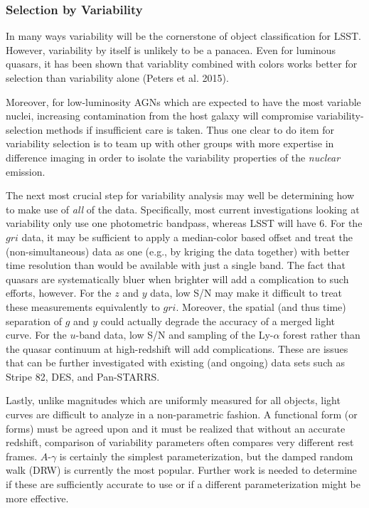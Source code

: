 \subsubsection{Selection by Variability}

In many ways variability will be the cornerstone of object
classification for LSST.  However, variability by itself is unlikely
to be a panacea.  Even for luminous quasars, it has been shown that
variablity combined with colors works better for selection than
variability alone (Peters et al. 2015).  

Moreover, for low-luminosity AGNs which are expected to have the most
variable nuclei, increasing contamination from the host galaxy will
compromise variability-selection methods if insufficient care is
taken.  Thus one clear to do item for variability selection is to team
up with other groups with more expertise in difference imaging in
order to isolate the variability properties of the {\em nuclear}
emission.

The next most crucial step for variability analysis may well be
determining how to make use of {\em all} of the data.  Specifically,
most current investigations looking at variability only use one
photometric bandpass, whereas LSST will have 6.  For the $gri$ data,
it may be sufficient to apply a median-color based offset and treat
the (non-simultaneous) data as one (e.g., by kriging the data
together) with better time resolution than would be available with
just a single band.  The fact that quasars are systematically bluer
when brighter will add a complication to such efforts, however.  For
the $z$ and $y$ data, low S/N may make it difficult to treat these
measurements equivalently to $gri$.  Moreover, the spatial (and thus
time) separation of $g$ and $y$ could actually degrade the accuracy of
a merged light curve.  For the $u$-band data, low S/N and sampling of
the Ly-$\alpha$ forest rather than the quasar continuum at
high-redshift will add complications.  These are issues that can be
further investigated with existing (and ongoing) data sets such as
Stripe 82, DES, and Pan-STARRS.

Lastly, unlike magnitudes which are uniformly measured for all
objects, light curves are difficult to analyze in a non-parametric
fashion.  A functional form (or forms) must be agreed upon and it must
be realized that without an accurate redshift, comparison of
variability parameters often compares very different rest frames.
$A$-$\gamma$ is certainly the simplest parameterization, but the
damped random walk (DRW) is currently the most popular.  Further work
is needed to determine if these are sufficiently accurate to use or if
a different parameterization might be more effective.

